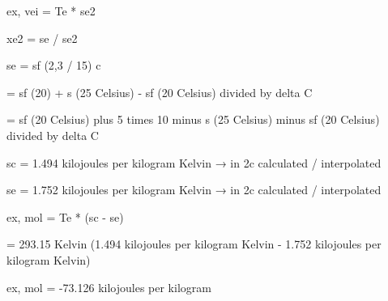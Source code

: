ex, vei = Te * se2

xe2 = se / se2

se = sf (2,3 / 15) c

= sf (20) + s (25 Celsius) - sf (20 Celsius) divided by delta C

= sf (20 Celsius) plus 5 times 10 minus s (25 Celsius) minus sf (20 Celsius) divided by delta C

sc = 1.494 kilojoules per kilogram Kelvin → in 2c calculated / interpolated

se = 1.752 kilojoules per kilogram Kelvin → in 2c calculated / interpolated

ex, mol = Te * (sc - se)

= 293.15 Kelvin (1.494 kilojoules per kilogram Kelvin - 1.752 kilojoules per kilogram Kelvin)

ex, mol = -73.126 kilojoules per kilogram